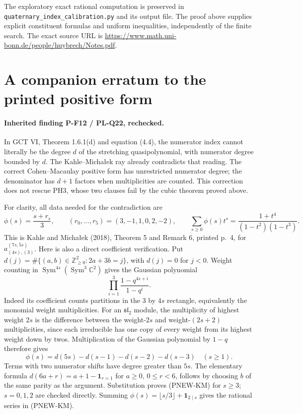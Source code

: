 The exploratory exact rational computation is preserved in
\nolinkurl{quaternary_index_calibration.py} and its output file.
The proof above supplies explicit constituent formulas and
uniform inequalities, independently of the finite search.
The exact source URL is
\url{https://www.math.uni-bonn.de/people/huybrech/Notes.pdf}.



\section{A companion erratum to the printed positive form}
\label{sec:positive-form-erratum}

\paragraph{Inherited finding P-F12 / PL-Q22, rechecked.}
In GCT VI, Theorem 1.6.1(d) and equation (4.4), the numerator
index cannot literally be the degree $d$ of the stretching
quasipolynomial, with numerator degree bounded by $d$.
The Kahle--Micha\l ek ray already contradicts that reading.
The correct Cohen--Macaulay positive form has unrestricted
numerator degree; the denominator has $d+1$ factors when
multiplicities are counted.  This correction does not rescue
PH3, whose two clauses fail by the cubic theorem proved above.

For clarity, all data needed for the contradiction are
\[
 \phi(s)=\frac{s+r_s}{3},\qquad
 (r_0,\ldots,r_5)=(3,-1,1,0,2,-2),\qquad
 \sum_{s\ge0}\phi(s)t^s=\frac{1+t^4}{(1-t^2)(1-t^3)}.
 \tag{PNEW-KM}
\]
This is Kahle and Micha\l ek (2018), Theorem 5 and Remark 6,
printed p.~4, for $a_{(4s),(3)}^{(7s,5s)}$.
Here is also a direct coefficient verification.  Put
$d(j)=\#\{(a,b)\in\mathbb Z_{\ge0}^2:2a+3b=j\}$,
with $d(j)=0$ for $j<0$.  Weight counting in
$\operatorname{Sym}^{4s}(\operatorname{Sym}^3\mathbb C^2)$
gives the Gaussian polynomial
\[
 \prod_{i=1}^3\frac{1-q^{4s+i}}{1-q^i}.
\]
Indeed its coefficient counts partitions in the $3$ by $4s$
rectangle, equivalently the monomial weight multiplicities.
For an $\mathfrak{sl}_2$ module, the multiplicity of highest
weight $2s$ is the difference between the weight-$2s$ and
weight-$(2s+2)$ multiplicities, since each irreducible has
one copy of every weight from its highest weight down by twos.
Multiplication of the Gaussian polynomial by $1-q$ therefore
gives
\[
 \phi(s)=d(5s)-d(s-1)-d(s-2)-d(s-3)\quad(s\ge1).
\]
Terms with two numerator shifts have degree greater than $5s$.
The elementary formula
$d(6a+r)=a+1-\mathbf1_{r=1}$ for $a\ge0$, $0\le r<6$,
follows by choosing $b$ of the same parity as the argument.
Substitution proves (PNEW-KM) for $s\ge3$; $s=0,1,2$
are checked directly.  Summing
$\phi(s)=\lfloor s/3\rfloor+\mathbf1_{2\mid s}$ gives
the rational series in (PNEW-KM).

